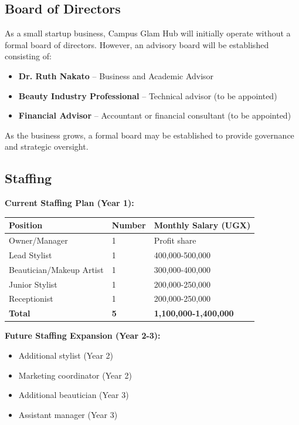 \subsection{Board of Directors}

As a small startup business, Campus Glam Hub will initially operate without a formal board of directors. However, an advisory board will be established consisting of:

\begin{itemize}[leftmargin=2em]
    \item \textbf{Dr. Ruth Nakato} -- Business and Academic Advisor
    \item \textbf{Beauty Industry Professional} -- Technical advisor (to be appointed)
    \item \textbf{Financial Advisor} -- Accountant or financial consultant (to be appointed)
\end{itemize}

As the business grows, a formal board may be established to provide governance and strategic oversight.

\subsection{Staffing}

\textbf{Current Staffing Plan (Year 1):}

\begin{tabular}{|l|l|l|}
\hline
\textbf{Position} & \textbf{Number} & \textbf{Monthly Salary (UGX)} \\
\hline
Owner/Manager & 1 & Profit share \\
Lead Stylist & 1 & 400,000-500,000 \\
Beautician/Makeup Artist & 1 & 300,000-400,000 \\
Junior Stylist & 1 & 200,000-250,000 \\
Receptionist & 1 & 200,000-250,000 \\
\hline
\textbf{Total} & \textbf{5} & \textbf{1,100,000-1,400,000} \\
\hline
\end{tabular}

\vspace{1em}

\textbf{Future Staffing Expansion (Year 2-3):}
\begin{itemize}[leftmargin=2em]
    \item Additional stylist (Year 2)
    \item Marketing coordinator (Year 2)
    \item Additional beautician (Year 3)
    \item Assistant manager (Year 3)
\end{itemize}

